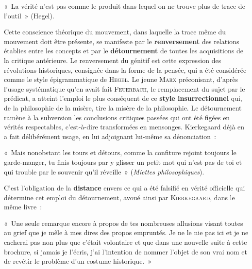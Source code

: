 \documentclass[french,twoside]{book} %
\newcommand\surname[1]{\textsc{#1}}
\newcommand\term[1]{\textbf{#1}}
\newenvironment{quoteblock}%
  {\begin{quoting}}
  {\end{quoting}}
\newenvironment{quotebar}{%
    \def\FrameCommand{{\color{rubric!10!}\vrule width 0.5em} \hspace{0.9em}}%
    \def\OuterFrameSep{\itemsep} %
    \MakeFramed {\advance\hsize-\width \FrameRestore}
  }%
  {%
    \endMakeFramed
  }
\renewenvironment{quoteblock}%
  {%
    \savenotes
    \setstretch{0.9}
    \normalfont
    \begin{quotebar}
  }
  {%
    \end{quotebar}
    \spewnotes
  }
\begin{document}
\begin{quoteblock}
\noindent « La vérité n’est pas comme le produit dans lequel on ne trouve plus de trace de l’outil » (Hegel).\end{quoteblock}

\noindent Cette conscience théorique du mouvement, dans laquelle la trace même du mouvement doit être présente, se manifeste par le \term{renversement} des relations établies entre les concepts et par le \term{détournement} de toutes les acquisitions de la critique antérieure. Le renversement du génitif est cette expression des révolutions historiques, consignée dans la forme de la pensée, qui a été considérée comme le style épigrammatique de \surname{Hegel}. Le jeune \surname{Marx} préconisant, d’après l’usage systématique qu’en avait fait \surname{Feuerbach}, le remplacement du sujet par le prédicat, a atteint l’emploi le plus conséquent de ce \term{style insurrectionnel} qui, de la philosophie de la misère, tire la misère de la philosophie. Le détournement ramène à la subversion les conclusions critiques passées qui ont été figées en vérités respectables, c’est-à-dire transformées en mensonges. Kierkegaard déjà en a fait délibérément usage, en lui adjoignant lui-même sa dénonciation :\par

\begin{quoteblock}
\noindent « Mais nonobstant les tours et détours, comme la confiture rejoint toujours le garde-manger, tu finis toujours par y glisser un petit mot qui n’est pas de toi et qui trouble par le souvenir qu’il réveille » (\emph{Miettes philosophiques}).\end{quoteblock}

\noindent C’est l’obligation de la \term{distance} envers ce qui a été falsifié en vérité officielle qui détermine cet emploi du détournement, avoué ainsi par \surname{Kierkegaard}, dans le même livre :\par

\begin{quoteblock}
\noindent « Une seule remarque encore à propos de tes nombreuses allusions visant toutes au grief que je mêle à mes dires des propos empruntés. Je ne le nie pas ici et je ne cacherai pas non plus que c’était volontaire et que dans une nouvelle suite à cette brochure, si jamais je l’écris, j’ai l’intention de nommer l’objet de son vrai nom et de revêtir le problème d’un costume historique. »\end{quoteblock}
\end{document}
